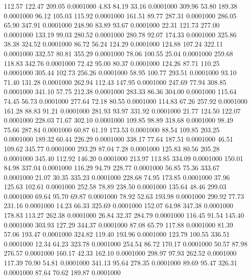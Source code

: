  112.57  122.47  209.05   0.0001000
   4.83   84.19   33.16   0.0001000
 309.96   53.80  189.38   0.0001000
  96.12  105.03  115.92   0.0001000
 161.51   89.77  287.31   0.0001000
 286.05   65.90  347.91   0.0001000
 248.90   83.89   93.67   0.0001000
  22.31  121.73  277.00   0.0001000
 133.19   99.03  280.52   0.0001000
 280.78   92.07  174.33   0.0001000
 325.86   38.38  324.52   0.0001000
  86.72   56.24  124.29   0.0001000
 124.88  107.24  322.11   0.0001000
 332.57   80.81  355.29   0.0001000
  78.06  100.55   25.04   0.0001000
 259.68  118.83  342.76   0.0001000
  72.42   95.00   80.37   0.0001000
 124.26   87.71  110.25   0.0001000
 305.44  102.73  256.26   0.0001000
  58.95  100.77  293.51   0.0001000
  93.10   71.40  131.28   0.0001000
 262.94  112.43  147.95   0.0001000
 247.69   77.94  308.85   0.0001000
 341.10   57.75  212.38   0.0001000
 283.33   86.36  304.00   0.0001000
 115.64   74.45   56.73   0.0001000
 277.64   72.18   80.55   0.0001000
 114.83   67.26  257.92   0.0001000
 161.28   88.83   91.21   0.0001000
 281.93   93.97  331.92   0.0001000
  21.77  124.50  122.07   0.0001000
 228.03   71.67  302.10   0.0001000
 109.85   98.89  318.68   0.0001000
  98.49   75.66  287.84   0.0001000
  60.87   61.19  173.53   0.0001000
  88.54  109.85  203.25   0.0001000
 189.32   60.44  226.29   0.0001000
 338.17   77.64  187.51   0.0001000
  46.51  109.62  345.77   0.0001000
 293.29   87.04    7.28   0.0001000
 125.83   80.56  205.28   0.0001000
 345.40  112.92  146.20   0.0001000
 213.97  113.85  334.09   0.0001000
 150.01   84.98  337.04   0.0001000
 116.29   94.79  228.77   0.0001000
  56.85   75.36  333.67   0.0001000
  21.07   30.35  335.23   0.0001000
 228.68   74.95  173.85   0.0001000
  37.96  125.63  102.61   0.0001000
 252.58   78.89  238.50   0.0001000
 135.64   48.46  299.03   0.0001000
  69.64   95.70   69.87   0.0001000
  78.92   52.63  193.98   0.0001000
 290.92   77.73  231.16   0.0001000
  14.23   66.33  325.69   0.0001000
 152.07   64.98  347.38   0.0001000
 178.83  113.27  262.38   0.0001000
  26.84   32.37  284.79   0.0001000
 116.45   91.54  145.40   0.0001000
 303.93  127.29  344.37   0.0001000
  87.08   65.79  117.88   0.0001000
  81.39   57.06  193.47   0.0001000
 324.82  119.40  193.96   0.0001000
 123.79  100.55  336.51   0.0001000
  12.34   64.23  323.78   0.0001000
 254.54   86.72  170.17   0.0001000
  50.57   87.98  276.57   0.0001000
 160.17   42.33  162.10   0.0001000
 298.97   97.93  262.52   0.0001000
 117.39   70.90   54.81   0.0001000
 341.13   95.64  278.35   0.0001000
  89.69   95.47  326.31   0.0001000
  87.64   70.62  189.87   0.0001000
